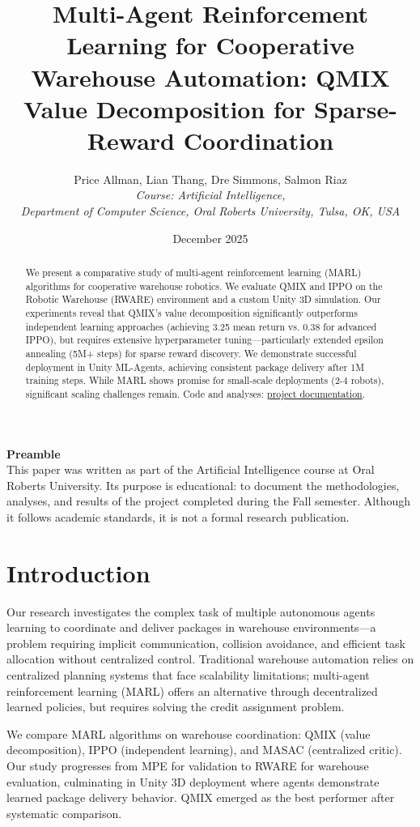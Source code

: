 \documentclass[11pt]{article}
\title{Multi-Agent Reinforcement Learning for Cooperative Warehouse Automation: QMIX Value Decomposition for Sparse-Reward Coordination}
\author{Price Allman, Lian Thang, Dre Simmons, Salmon Riaz \\
\textit{Course: Artificial Intelligence,}\\
\textit{Department of Computer Science, Oral Roberts University, Tulsa, OK, USA}}
\date{December 2025}
\begin{document}
\maketitle

\begin{center}
\textbf{Preamble}\\
This paper was written as part of the Artificial Intelligence course at Oral Roberts University. Its purpose is educational: to document the methodologies, analyses, and results of the project completed during the Fall semester. Although it follows academic standards, it is not a formal research publication.
\end{center}

\begin{abstract}
We present a comparative study of multi-agent reinforcement learning (MARL) algorithms for cooperative warehouse robotics. We evaluate QMIX and IPPO on the Robotic Warehouse (RWARE) environment and a custom Unity 3D simulation. Our experiments reveal that QMIX's value decomposition significantly outperforms independent learning approaches (achieving 3.25 mean return vs. 0.38 for advanced IPPO), but requires extensive hyperparameter tuning---particularly extended epsilon annealing (5M+ steps) for sparse reward discovery. We demonstrate successful deployment in Unity ML-Agents, achieving consistent package delivery after 1M training steps. While MARL shows promise for small-scale deployments (2-4 robots), significant scaling challenges remain. Code and analyses: \href{https://pallman14.github.io/MARL-QMIX-Warehouse-Robots/}{project documentation}.
\end{abstract}

\section{Introduction}

Our research investigates the complex task of multiple autonomous agents learning to coordinate and deliver packages in warehouse environments---a problem requiring implicit communication, collision avoidance, and efficient task allocation without centralized control. Traditional warehouse automation relies on centralized planning systems that face scalability limitations; multi-agent reinforcement learning (MARL) offers an alternative through decentralized learned policies, but requires solving the credit assignment problem.

We compare MARL algorithms on warehouse coordination: QMIX \citep{rashid2018qmix} (value decomposition), IPPO (independent learning), and MASAC (centralized critic). Our study progresses from MPE for validation to RWARE for warehouse evaluation, culminating in Unity 3D deployment where agents demonstrate learned package delivery behavior. QMIX emerged as the best performer after systematic comparison.
\end{document}
